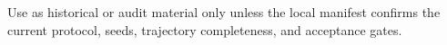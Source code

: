 Use as historical or audit material only unless the local manifest confirms the current protocol, seeds, trajectory completeness, and acceptance gates.
